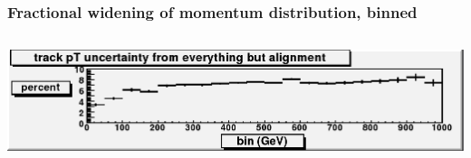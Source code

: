 \documentclass[compress]{beamer}
\begin{document}
\begin{frame}
\frametitle{Fractional widening of momentum distribution, binned}
\begin{columns}
\includegraphics[width=\linewidth]{track_uncertainty_from_all_but_alignment.png}



\end{columns}
\end{frame}
\end{document}
